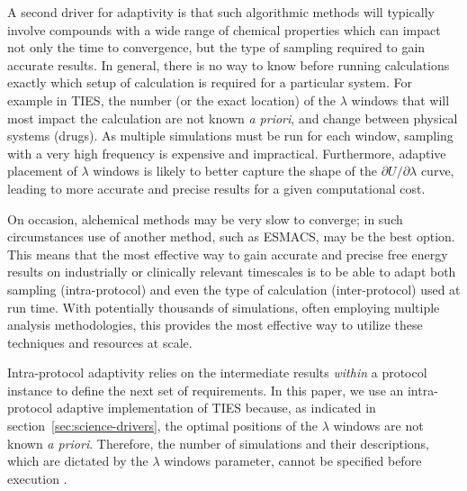 
A second driver for adaptivity is that such algorithmic methods  will
typically involve compounds with a wide range of chemical properties which can
impact not only the time to convergence, but the type of sampling required to
gain accurate results. In general, there is no way to know before running
calculations exactly which setup of calculation is required for a particular
system. For example in TIES, the number (or the exact location) of the
$\lambda$ windows that will most impact the calculation are not known
\textit{a priori}, and change between physical systems (drugs). As multiple
simulations must be run for each window, sampling with a very high frequency
is expensive and impractical. Furthermore, adaptive placement of $\lambda$
windows is likely to better capture the shape of the 
$\partial U/\partial\lambda$ curve, leading to more accurate and precise 
results for a given computational cost.

On occasion, alchemical methods may be very slow to converge; in such
circumstances use of another method, such as ESMACS, may be the best option.
This means that the most effective way to gain accurate and precise free
energy results on industrially or clinically relevant timescales is to be able
to adapt both sampling (intra-protocol) and even the type of calculation 
(inter-protocol) used at run time. With potentially thousands of simulations, 
often employing multiple analysis methodologies, this provides the most 
effective way to utilize these techniques and resources at scale.


Intra-protocol adaptivity relies on the intermediate results \textit{within}
a protocol instance to define the next set of requirements. In this paper, we
use an intra-protocol adaptive implementation of TIES because, as indicated
in section~\ref{sec:science-drivers}, the optimal positions of the $\lambda$
windows are not known \textit{a priori}. Therefore, the number of simulations
and their descriptions, which are dictated by the $\lambda$ windows
parameter, cannot be specified before execution .

